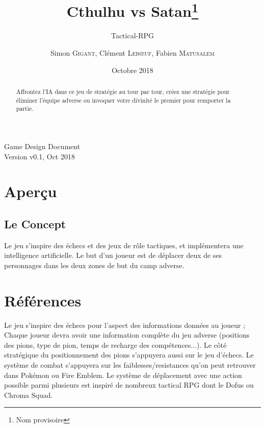 \documentclass[a4paper]{scrreprt}
\title{Cthulhu vs Satan\footnote{Nom provisoire}}
\subtitle{Tactical-RPG}
\date{Octobre 2018}
\author{Simon \textsc{Gigant}, Clément \textsc{Leb\oe uf}, Fabien \textsc{Matusalem}}
\begin{document}
\maketitle
\null\vfill
\noindent
Game Design Document\\
Version v0.1, Oct 2018\\
\newpage

\begin{abstract}
Affrontez l'IA dans ce jeu de stratégie au tour par tour, créez une stratégie pour éliminer l'équipe adverse ou invoquer votre divinité le premier pour remporter la partie.
\end{abstract}

\tableofcontents

\chapter{Aperçu}

\section{Le Concept}
Le jeu s'inspire des échecs et des jeux de rôle tactiques, et implémentera une intelligence artificielle. Le but d'un joueur est de déplacer deux de ses personnages dans les deux zones de but du camp adverse.




\chapter{Références}
Le jeu s'inspire des échecs pour l'aspect des informations données au joueur ; Chaque joueur devra avoir une information complète du jeu adverse (positions des pions, type de pion, temps de recharge des compétences...). Le côté stratégique du positionnement des pions s'appuyera aussi sur le jeu d'échecs.
Le système de combat s'appuyera sur les faiblesses/resistances qu'on peut retrouver dans Pokémon ou Fire Emblem.
Le système de déplacement avec une action possible parmi plusieurs est inspiré de nombreux tactical RPG dont le Dofus ou Chroma Squad.
\end{document}
